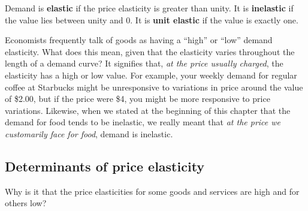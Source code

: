 \begin{DefBox}
Demand is \textbf{elastic} if the price elasticity is greater than unity. It is \textbf{inelastic} if the value lies between unity and 0. It is \textbf{unit elastic} if the value is exactly one.
\end{DefBox}

Economists frequently talk of goods as having a ``high''
or ``low'' demand elasticity. What does this mean, given that the elasticity varies throughout
the length of a demand curve? It signifies that, \textit{at the price
usually charged}, the elasticity has a high or low value. For example, your
weekly demand for regular coffee at Starbucks might be unresponsive to
variations in price around the value of \$2.00, but if the price were \$4,
you might be more responsive to price variations. Likewise, when we stated
at the beginning of this chapter that the demand for food tends to be
inelastic, we really meant that \textit{at the price we customarily face for
food}, demand is inelastic.

\subsection*{Determinants of price elasticity}

Why is it that the price elasticities for some goods and services are high
and for others low? 

